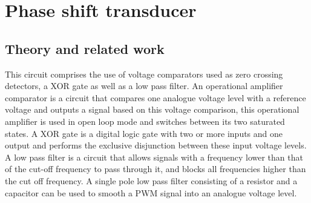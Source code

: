 \chapter{Phase shift transducer}
\section{Theory and related work} \label{sec:literature_phasetransducer}
This circuit comprises the use of voltage comparators used as zero crossing detectors, a XOR gate as well as a low pass filter. An operational amplifier comparator is a circuit that compares one analogue voltage level with a reference voltage and outputs a signal based on this voltage comparison, this operational amplifier is used in open loop mode and switches between its two saturated states.\vspace{4mm} \newline %
A XOR gate is a digital logic gate with two or more inputs and one output and performs the exclusive disjunction between these input voltage levels. %
A low pass filter is a circuit that allows signals with a frequency lower than that of the cut-off frequency to pass through it, and blocks all frequencies higher than the cut off frequency. A single pole low pass filter consisting of a resistor and a capacitor can be used to smooth a PWM signal into an analogue voltage level.


